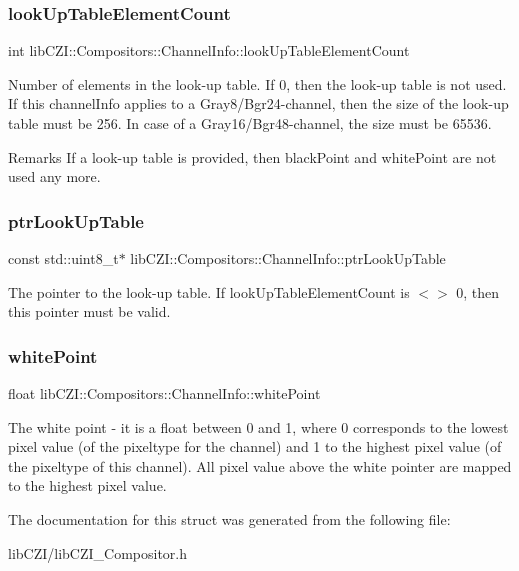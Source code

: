 \subsubsection{\texorpdfstring{look\+Up\+Table\+Element\+Count}{lookUpTableElementCount}}
{\footnotesize\ttfamily int lib\+C\+Z\+I\+::\+Compositors\+::\+Channel\+Info\+::look\+Up\+Table\+Element\+Count}

Number of elements in the look-\/up table. If 0, then the look-\/up table is not used. If this channel\+Info applies to a Gray8/\+Bgr24-\/channel, then the size of the look-\/up table must be 256. In case of a Gray16/\+Bgr48-\/channel, the size must be 65536. \begin{DoxyRemark}{Remarks}
If a look-\/up table is provided, then {\ttfamily black\+Point} and {\ttfamily white\+Point} are not used any more. 
\end{DoxyRemark}
\mbox{\label{structlib_c_z_i_1_1_compositors_1_1_channel_info_aced547bcca881f7101bcba53b113fe15}} 
\subsubsection{\texorpdfstring{ptr\+Look\+Up\+Table}{ptrLookUpTable}}
{\footnotesize\ttfamily const std\+::uint8\+\_\+t$\ast$ lib\+C\+Z\+I\+::\+Compositors\+::\+Channel\+Info\+::ptr\+Look\+Up\+Table}

The pointer to the look-\/up table. If look\+Up\+Table\+Element\+Count is $<$$>$ 0, then this pointer must be valid. \mbox{\label{structlib_c_z_i_1_1_compositors_1_1_channel_info_acd5158e2c9011e0d5af98363c89d6a96}} 
\subsubsection{\texorpdfstring{white\+Point}{whitePoint}}
{\footnotesize\ttfamily float lib\+C\+Z\+I\+::\+Compositors\+::\+Channel\+Info\+::white\+Point}

The white point -\/ it is a float between 0 and 1, where 0 corresponds to the lowest pixel value (of the pixeltype for the channel) and 1 to the highest pixel value (of the pixeltype of this channel). All pixel value above the white pointer are mapped to the highest pixel value. 

The documentation for this struct was generated from the following file\+:\begin{DoxyCompactItemize}
\item 
lib\+C\+Z\+I/lib\+C\+Z\+I\+\_\+\+Compositor.\+h\end{DoxyCompactItemize}
